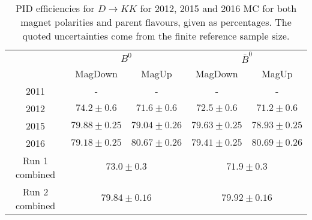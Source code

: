 \begin{table}[H]
    \centering
    \begin{tabular}{ccccc}
        \toprule
        & \multicolumn{2}{c}{$B^0$} &  \multicolumn{2}{c}{$\bar{B}^0$}\\
        & MagDown & MagUp & MagDown & MagUp\\
        \midrule
2011 & - & - & - & - \\
2012 & $74.2 \pm 0.6$ & $71.6 \pm 0.6$ & $72.5 \pm 0.6$ & $71.2 \pm 0.6$ \\
2015 & $79.88 \pm 0.25$ & $79.04 \pm 0.26$ & $79.63 \pm 0.25$ & $78.93 \pm 0.25$ \\
2016 & $79.18 \pm 0.25$ & $80.67 \pm 0.26$ & $79.41 \pm 0.25$ & $80.69 \pm 0.26$ \\
        \midrule
Run 1 combined & \multicolumn{2}{c}{$73.0 \pm 0.3$} & \multicolumn{2}{c}{$71.9 \pm 0.3$} \\
Run 2 combined & \multicolumn{2}{c}{$79.84 \pm 0.16$} & \multicolumn{2}{c}{$79.92 \pm 0.16$} \\
        \bottomrule
    \end{tabular}
    \caption{PID efficiencies for $D \to KK$ for 2012, 2015 and 2016 MC for both magnet polarities and parent flavours, given as percentages. The quoted  uncertainties come from the finite reference sample size.}
\label{tab:PID_efficiency_KK}
\end{table}
